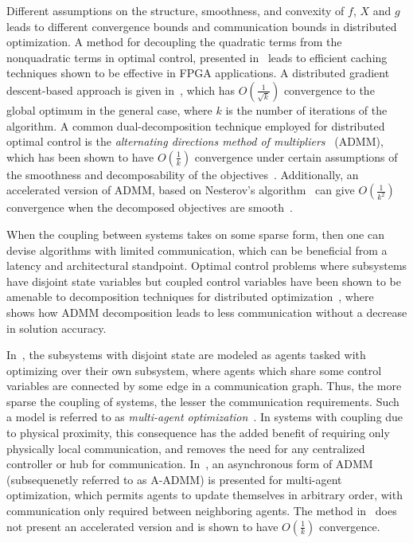 Different assumptions on the structure, smoothness, and convexity of $f$, $X$ and $g$ leads to different convergence bounds and communication bounds in distributed optimization. A method for decoupling the quadratic terms from the nonquadratic terms in optimal control, presented in~\cite{Donoghue2013Splitting} leads to efficient caching techniques shown to be effective in FPGA applications. A distributed gradient descent-based approach is given in~\cite{camponogara2009distributed}, which has $O\left(\frac{1}{\sqrt{k}}\right)$ convergence to the global optimum in the general case, where $k$ is the number of iterations of the algorithm.  A common dual-decomposition technique employed for distributed optimal control is the \emph{alternating directions method of multipliers}~\cite{Boyd2010Distributed,Donoghue2013Splitting,gabay1976dual} (ADMM), which has been shown to have $O\left(\frac{1}{k}\right)$ convergence under certain assumptions of the smoothness and decomposability of the objectives~\cite{Wei2013On}. Additionally, an accelerated version of ADMM, based on Nesterov's algorithm~\cite{Nesterov1983Method} can give $O\left(\frac{1}{k^2}\right)$ convergence when the decomposed objectives are smooth~\cite{Pu2014Fast}.

When the coupling between systems takes on some sparse form, then one can devise algorithms with limited communication, which can be beneficial from a latency and  architectural standpoint. Optimal control problems where subsystems have disjoint state variables but coupled control variables have been shown to be amenable to decomposition techniques for distributed optimization~\cite{Giselsson2013Accelerated,camponogara2009distributed}, where~\cite{mota2012distributed} shows how ADMM decomposition leads to less communication without a decrease in solution accuracy.

In~\cite{Giselsson2013Accelerated,mota2012distributed,camponogara2009distributed}, the subsystems with disjoint state are modeled as agents tasked with optimizing over their own subsystem, where agents which share some control variables are connected by some edge in a communication graph. Thus, the more sparse the coupling of systems, the lesser the communication requirements. Such a model is referred to as \emph{multi-agent optimization}~\cite{Wei2013On}. In systems with coupling due to physical proximity, this consequence has the added benefit of requiring only physically local communication, and removes the need for any centralized controller or hub for communication. In~\cite{Wei2013On}, an asynchronous form of ADMM (subsequenetly referred to as A-ADMM) is presented for multi-agent optimization, which permits agents to update themselves in arbitrary order, with communication only required between neighboring agents. The method in~\cite{Wei2013On} does not present an accelerated version and is shown to have $O\left(\frac{1}{k}\right)$ convergence.

